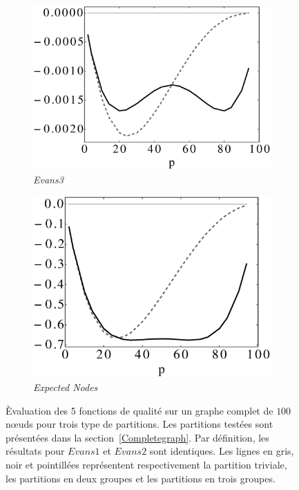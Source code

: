 \begin{figure}
	\begin{subfigure}{0.4\linewidth}
		\includegraphics[width=\linewidth]{img/ExpectedNodes/1Clique/Clique_Evans3.eps}
		\caption{\label{fig:1CE3}\emph{Evans3}}		
	\end{subfigure}\hspace*{1cm}
	\begin{subfigure}{0.4\linewidth}
		\includegraphics[width=\linewidth]{img/ExpectedNodes/1Clique/Clique_Expectednode.eps}
		\caption{\label{fig:1CMod}\emph{Expected Nodes}}		
	\end{subfigure}
		
		\caption{\`Evaluation des 5 fonctions de qualité sur un graphe complet  de $100$ n\oe uds pour trois type de partitions.
		Les partitions testées sont présentées dans la section~\ref{Completegraph}.
		Par définition, les résultats pour $Evans1$ et $Evans2$ sont identiques.
		Les lignes en gris, noir et pointillées représentent respectivement la partition triviale, les partitions en deux groupes et les partitions en trois groupes.}
		\label{fig:1Cres}
\end{figure}


